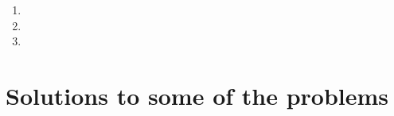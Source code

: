 \documentclass{article}
\begin{document}
\begin{enumerate}


\item 


\item 



\item 


\end{enumerate}

\section{Solutions to some of the problems}






\end{document}
